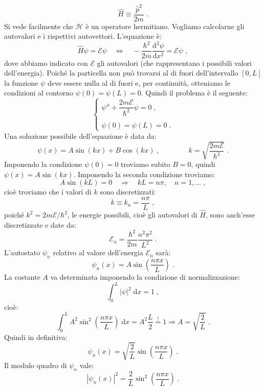 \documentclass[12pt,a4paper]{report}
\theoremstyle{definition}
\newcommand{\dev}[3][]{\frac{\mathrm{d}^{#1} #2}{\mathrm{d} #3^{#1}}}
\newcommand{\ham}{\mathcal{H}}
\numberwithin{equation}{section}
\newcommand{\diff}[1][]{\mathrm{d}#1}
\begin{document}
$$
\hat{H} \equiv \frac{\hat{p}^2}{2m}\;.
$$
Si vede facilmente che $\ham$ è un operatore hermitiano. Vogliamo calcolarne gli autovalori e i rispettivi autovettori. L'equazione è:
\begin{equation}
\hat{H} \psi=\mathcal{E}\psi\quad \Longleftrightarrow \quad-\frac{\hbar^2}{2m}\dev[2]{\psi}{x}=\mathcal{E}\psi\;,
\end{equation}
dove abbiamo indicato con $\mathcal{E}$ gli autovalori (che rappresentano i possibili valori dell'energia). Poiché la particella non può trovarsi al di fuori dell'intervallo $[0,L]$ la funzione $\psi$ deve essere nulla al di fuori e, per continuità, otteniamo le condizioni al contorno $\psi(0)=\psi(L)=0$. Quindi il problema è il seguente:
\begin{equation}
\begin{cases}
\psi''+\dfrac{2m\mathcal{E}}{\hbar^2}\psi=0\;, \\
\\
\psi(0)=\psi(L)=0\;.
\end{cases}
\end{equation}
Una soluzione possibile dell'equazione è data da:
$$
\psi(x)=A\sin(kx)+B\cos(kx)\;,\qquad\qquad k=\sqrt{\frac{2m\mathcal{E}}{\hbar^2}}\;.
$$
Imponendo la condizione $\psi(0)=0$ troviamo subito $B=0$, quindi $\psi(x)=A\sin(kx)$. Imponendo la seconda condizione troviamo:
$$
A\sin(kL)=0\quad \Longrightarrow \quad kL=n\pi,\quad n=1,\ldots\;,
$$
cioè troviamo che i valori di $k$ sono discretizzati:
$$
k\equiv k_n=\frac{n\pi}{L}\;,
$$
poiché $k^2=2m\mathcal{E}/\hbar^2$, le energie possibili, cioè gli autovalori di $\hat{H}$, sono anch'esse discretizzate e date da:
\begin{equation}
\mathcal{E}_n=\frac{\hbar^2}{2m}\frac{n^2\pi^2}{L^2}\;.
\end{equation}
L'autostato $\psi_n$ relativo al valore dell'energia $\mathcal{E}_n$ sarà:
\begin{equation}
\psi_n(x)=A\sin\left(\frac{n\pi x}{L}\right)\;.
\end{equation}
La costante $A$ va determinata imponendo la condizione di normalizzazione:
$$
\int_0^L |\psi|^2\;\diff{x}=1\;,
$$
cioè:
$$
\int_0^L A^2 \sin^2\left(\frac{n\pi x}{L}\right)\;\diff{x}=A^2\frac{L}{2}\stackrel{!}{=}1 \Longrightarrow A=\sqrt{\frac{2}{L}}\;.
$$
Quindi in definitiva:
\begin{equation}
\psi_n(x)=\sqrt{\frac{2}{L}}\sin\left(\frac{n\pi x}{L}\right)\;.
\end{equation}
Il modulo quadro di $\psi_n$ vale:
$$
|\psi_n(x)|^2=\frac{2}{L}\sin^2\left(\frac{n\pi x}{L}\right)\;.
$$
\end{document}
